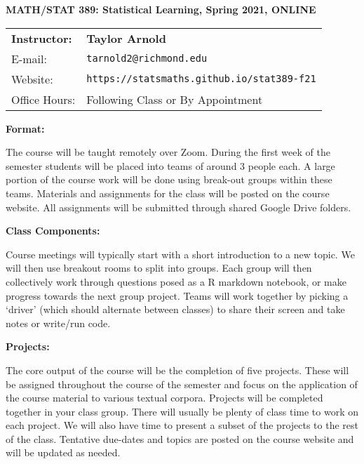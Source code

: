 \documentclass[12pt, a4paper]{article}
\begin{document}
\begin{center}
\textbf{MATH/STAT 389: Statistical Learning, Spring 2021, ONLINE}
\end{center}

\noindent
\begin{tabular}{ l l }
\textbf{Instructor:} &  \textbf{Taylor Arnold} \\
E-mail: & \texttt{tarnold2@richmond.edu} \\
Website: & \texttt{https://statsmaths.github.io/stat389-f21} \\
Office Hours: & Following Class or By Appointment
\end{tabular}

\vspace{0.5cm}

\textbf{Format:} \vspace{6pt}

The course will be taught remotely over Zoom. During the first week of the
semester students will be placed into teams of around 3 people each. A large
portion of the course work will be done using break-out groups within these
teams. Materials and assignments for the class will be posted on the course
website. All assignments will be submitted through shared Google Drive folders.

\vspace{12pt}

\textbf{Class Components:} \vspace{6pt}

Course meetings will typically start with a short introduction to a new topic.
We will then use breakout rooms to split into groups. Each group will then
collectively work through questions posed as a R markdown notebook, or make
progress towards the next group project. Teams will work together by picking a
`driver' (which should alternate between classes) to share their screen and
take notes or write/run code.

\vspace{12pt}

\textbf{Projects:} \vspace{6pt}

The core output of the course will be the completion of five projects. These
will be assigned throughout the course of the semester and focus on the
application of the course material to various textual corpora. Projects will
be completed together in your class group. There will usually be plenty of
class time to work on each project. We will also have time to present a subset
of the projects to the rest of the class. Tentative due-dates and topics are
posted on the course website and will be updated as needed.
\end{document}
